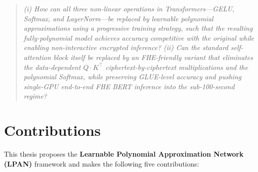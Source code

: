 \begin{quote}
\emph{(i) How can all three non-linear operations in Transformers---GELU, Softmax, and LayerNorm---be replaced by learnable polynomial approximations using a progressive training strategy, such that the resulting fully-polynomial model achieves accuracy competitive with the original while enabling non-interactive encrypted inference? (ii) Can the standard self-attention block itself be replaced by an FHE-friendly variant that eliminates the data-dependent $Q\!\cdot\!K^\top$ ciphertext-by-ciphertext multiplications and the polynomial Softmax, while preserving GLUE-level accuracy and pushing single-GPU end-to-end FHE BERT inference into the sub-100-second regime?}
\end{quote}


\section{Contributions}

This thesis proposes the \textbf{Learnable Polynomial Approximation Network (LPAN)} framework and makes the following five contributions:


